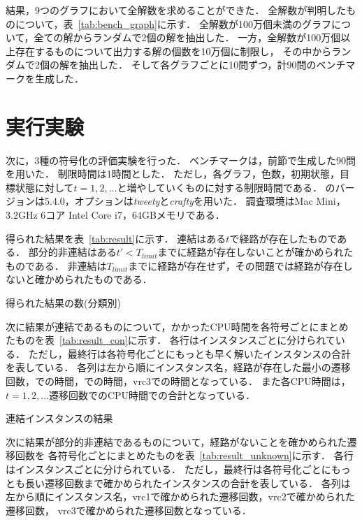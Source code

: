 結果，9つのグラフにおいて全解数を求めることができた．
全解数が判明したものについて，表~\ref{tab:bench_graph}に示す．
全解数が100万個未満のグラフについて，全ての解からランダムで2個の解を抽出した．
一方，全解数が100万個以上存在するものについて出力する解の個数を10万個に制限し，
その中からランダムで2個の解を抽出した．
そして各グラフごとに10問ずつ，計90問のベンチマークを生成した．

\section{実行実験}
次に，3種の符号化の評価実験を行った．
ベンチマークは，前節で生成した90問を用いた．
制限時間は1時間とした．
ただし，各グラフ，色数，初期状態，目標状態に対して$t=1, 2, \dots$と増やしていくものに対する制限時間である．
{\clingo}のバージョンは5.4.0，オプションは\textsl{tweety}と\textsl{crafty}を用いた．
調査環境はMac Mini，3.2GHz 6コア Intel Core i7，64GBメモリである．

得られた結果を表~\ref{tab:result}に示す．
連結はある$t$で経路が存在したものである．
部分的非連結はある$t' \lt T_{limit}$までに経路が存在しないことが確かめられたものである．
非連結は$T_{limit}$までに経路が存在せず，その問題では経路が存在しないと確かめられたものである．

\begin{table}
  \centering
  \caption{得られた結果の数(分類別)}
  
  \label{tab:result}
\end{table}

次に結果が連結であるものについて，かかったCPU時間を各符号ごとにまとめたものを表~\ref{tab:result_con}に示す．
各行はインスタンスごとに分けられている．
ただし，最終行は各符号化ごとにもっとも早く解いたインスタンスの合計を表している．
各列は左から順にインスタンス名，経路が存在した最小の遷移回数，での時間，での時間，vrc3での時間となっている．
また各CPU時間は，$t=1, 2, \dots $遷移回数でのCPU時間での合計となっている．

\begin{table}
  \centering
  \caption{連結インスタンスの結果}
  
  \label{tab:result_con}
\end{table}

次に結果が部分的非連結であるものについて，経路がないことを確かめられた遷移回数を
各符号化ごとにまとめたものを表~\ref{tab:result_unknown}に示す．
各行はインスタンスごとに分けられている．
ただし，最終行は各符号化ごとにもっとも長い遷移回数まで確かめられたインスタンスの合計を表している．
各列は左から順にインスタンス名，vrc1で確かめられた遷移回数，vrc2で確かめられた遷移回数，
vrc3で確かめられた遷移回数となっている．

